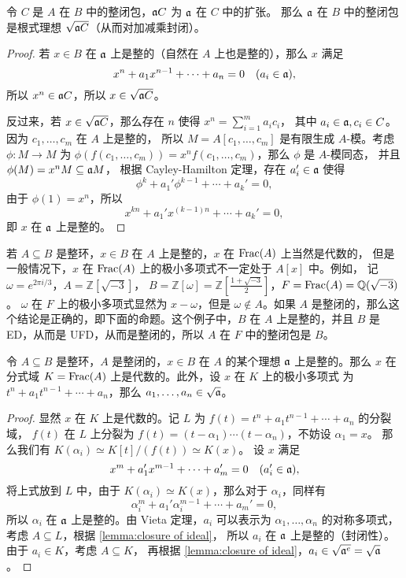 \begin{lemma}\label{lemma:closure of ideal}
  令 $C$ 是 $A$ 在 $B$ 中的整闭包，$\mathfrak{a}C$ 为 $\mathfrak{a}$ 在 $C$ 中的扩张。
  那么 $\mathfrak{a}$ 在 $B$ 中的整闭包是根式理想 $\sqrt{\mathfrak{a}C}$（从而对加减乘封闭）。
\end{lemma}
\begin{proof}
  若 $x\in B$ 在 $\mathfrak{a}$ 上是整的（自然在 $A$ 上也是整的），那么 $x$ 满足
  \[
    x^n+a_1x^{n-1}+\cdots+a_n=0\quad (a_i\in\mathfrak{a}),  
  \]
  所以 $x^n\in\mathfrak{a}C$，所以 $x\in\sqrt{\mathfrak{a}C}$。

  反过来，若 $x\in\sqrt{\mathfrak{a}C}$，那么存在 $n$ 使得 $x^n=\sum_{i=1}^m a_ic_i$，
  其中 $a_i\in\mathfrak{a},c_i\in C$。因为 $c_1,\dots,c_m$ 在 $A$ 上是整的，
  所以 $M=A[c_1,\dots,c_m]$ 是有限生成 $A$-模。考虑 $\phi:M\to M$ 为
  $\phi(f(c_1,\dots,c_m))=x^nf(c_1,\dots,c_m)$，那么 $\phi$ 是 $A$-模同态，
  并且 $\phi(M)=x^nM\subseteq\mathfrak{a}M$，
  根据 Cayley-Hamilton 定理，存在 $a_i'\in \mathfrak{a}$ 使得
  \[
    \phi^k+a_1'\phi^{k-1}+\cdots+a_k'=0,  
  \]
  由于 $\phi(1)=x^n$，所以 
  \[
    x^{kn}+a_1'x^{(k-1)n}+\cdots+a_k'=0,
  \]
  即 $x$ 在 $\mathfrak{a}$ 上是整的。
\end{proof}

若 $A\subseteq B$ 是整环，$x\in B$ 在 $A$ 上是整的，$x$ 在 $\operatorname{Frac}(A)$ 上当然是代数的，
但是一般情况下，$x$ 在 $\operatorname{Frac}(A)$ 上的极小多项式不一定处于 $A[x]$ 中。例如，
记 $\omega=e^{2\pi i/3}$，$A=\mathbb{Z}[\sqrt{-3}]$，
$B=\mathbb{Z}[\omega]=\mathbb{Z}[\frac{1+\sqrt{-3}}{2}]$，$F=\operatorname{Frac}(A)=\mathbb{Q}(\sqrt{-3})$。
$\omega$ 在 $F$ 上的极小多项式显然为 $x-\omega$，但是 $\omega\notin A$。如果
$A$ 是整闭的，那么这个结论是正确的，即下面的命题。这个例子中，$B$
在 $A$ 上是整的，并且 $B$ 是 ED，从而是 UFD，从而是整闭的，所以 $A$ 在 $F$
中的整闭包是 $B$。

\begin{proposition}\label{prop:minimal polynominal of x}
  令 $A\subseteq B$ 是整环，$A$ 是整闭的，$x\in B$ 在 $A$ 的某个理想 $\mathfrak{a}$ 
  上是整的。那么 $x$ 在分式域 $K=\operatorname{Frac}(A)$ 上是代数的。此外，设 $x$ 在 $K$ 上的极小多项式
  为 $t^n+a_1t^{n-1}+\cdots+a_n$，那么 $a_1,\dots,a_n\in\sqrt{\mathfrak{a}}$。
\end{proposition}
\begin{proof}
  显然 $x$ 在 $K$ 上是代数的。记 $L$ 为 $f(t)=t^n+a_1t^{n-1}+\cdots+a_n$ 的分裂域，
  $f(t)$ 在 $L$ 上分裂为 $f(t)=(t-\alpha_1)\cdots(t-\alpha_n)$，不妨设 $\alpha_1=x$。
  那么我们有 $K(\alpha_i)\simeq K[t]/(f(t))\simeq K(x)$。
  设 $x$ 满足
  \[
    x^m+a_1'x^{m-1}+\cdots +a_m'=0\quad (a_i'\in \mathfrak{a}),  
  \]
  将上式放到 $L$ 中，由于 $K(\alpha_i)\simeq K(x)$，那么对于 $\alpha_i$，同样有 
  \[
    \alpha_i^m+a_1'\alpha_i^{m-1}+\cdots +a_m'=0,  
  \]
  所以 $\alpha_i$ 在 $\mathfrak{a}$ 上是整的。由 Vieta 定理，$a_i$ 可以表示为 $\alpha_1,\dots,\alpha_n$
  的对称多项式，考虑 $A\subseteq L$，根据 \autoref{lemma:closure of ideal}，
  所以 $a_i$ 在 $\mathfrak{a}$ 上是整的（封闭性）。
  由于 $a_i\in K$，考虑 $A\subseteq K$，
  再根据 \autoref{lemma:closure of ideal}，$a_i\in\sqrt{\mathfrak{a}^e}=\sqrt{\mathfrak{a}}$。
\end{proof}

